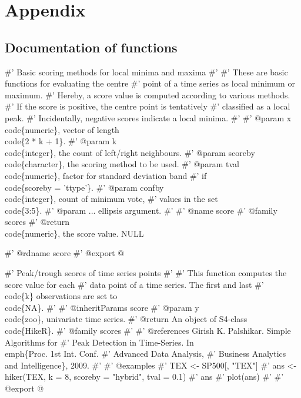 \documentclass[a4paper]{article}
\begin{document}
\section{Appendix}
\label{S4}

\subsection{Documentation of functions}
\label{S4SS1}

\nwenddocs{}\endmoddef
#' Basic scoring methods for local minima and maxima
#'
#' These are basic functions for evaluating the centre
#' point of a time series as local minimum or maximum.
#' Hereby, a score value is computed according to various methods.
#' If the score is positive, the centre point is tentatively
#' classified as a local peak.
#' Incidentally, negative scores indicate a local minima.
#'
#' @param x \\code\{numeric\}, vector of length \\code\{2 * k + 1\}.
#' @param k \\code\{integer\}, the count of left/right neighbours.
#' @param scoreby \\code\{character\}, the scoring method to be used.
#' @param tval \\code\{numeric\}, factor for standard deviation band
#' if \\code\{scoreby = 'ttype'\}.
#' @param confby \\code\{integer\}, count of minimum vote,
#' values in the set \\code\{3:5\}.
#' @param ... ellipsis argument.
#'
#' @name score
#' @family scores
#' @return \\code\{numeric\}, the score value.
NULL

#' @rdname score
#' @export
\nwendcode{}@

\nwenddocs{}\endmoddef
#' Peak/trough scores of time series points
#'
#' This function computes the score value for each
#' data point of a time series. The first and last
#' \\code\{k\} observations are set to \\code\{NA\}.
#'
#' @inheritParams score
#' @param y \\code\{zoo\}, univariate time series.
#' @return An object of S4-class \\code\{HikeR\}.
#' @family scores
#'
#' @references Girish K. Palshikar. Simple Algorithms for
#' Peak Detection in Time-Series. In \\emph\{Proc. 1st Int. Conf.
#' Advanced Data Analysis,
#' Business Analytics and Intelligence\}, 2009.
#'
#' @examples
#' TEX <- SP500[, "TEX"]
#' ans <- hiker(TEX, k = 8, scoreby = "hybrid", tval = 0.1)
#' ans
#' plot(ans)
#'
#' @export
\nwendcode{}@
\end{document}
